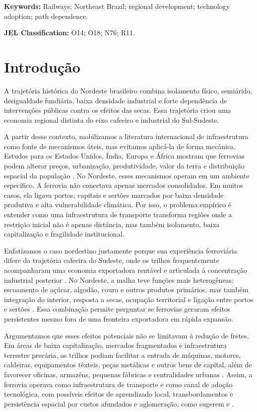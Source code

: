 \documentclass[12pt,a4paper]{article}
\newcommand{\keywords}{Railways; Northeast Brazil; regional development; technology adoption; path dependence}
\newcommand{\jel}{O14; O18; N76; R11}
\begin{document}
\vspace{0.3cm}
\noindent\textbf{Keywords:} \keywords.

\vspace{0.3cm}
\noindent\textbf{JEL Classification:} \jel.

\newpage

\section{Introdução}

A trajetória histórica do Nordeste brasileiro combina isolamento físico, semiárido, desigualdade fundiária, baixa densidade industrial e forte dependência de intervenções públicas contra os efeitos das secas. Essa trajetória criou uma economia regional distinta do eixo cafeeiro e industrial do Sul-Sudeste.

A partir desse contexto, mobilizamos a literatura internacional de infraestrutura como fonte de mecanismos úteis, mas evitamos aplicá-la de forma mecânica. Estudos para os Estados Unidos, Índia, Europa e África mostram que ferrovias podem alterar preços, urbanização, produtividade, valor da terra e distribuição espacial da população \citep{fogel1964,donaldsonhornbeck2016,donaldson2018,berger2017,jedwab2016}. No Nordeste, esses mecanismos operam em um ambiente específico. A ferrovia não conectava apenas mercados consolidados. Em muitos casos, ela ligava portos, capitais e sertões marcados por baixa densidade produtiva e alta vulnerabilidade climática. Por isso, o problema empírico é entender como uma infraestrutura de transporte transforma regiões onde a restrição inicial não é apenas distância, mas também isolamento, baixa capitalização e fragilidade institucional.

Enfatizamos o caso nordestino justamente porque sua experiência ferroviária difere da trajetória cafeeira do Sudeste, onde os trilhos frequentemente acompanharam uma economia exportadora rentável e articulada à concentração industrial posterior \citep{cano1977,summerhill2003}. No Nordeste, a malha teve funções mais heterogêneas: escoamento de açúcar, algodão, couro e outros produtos primários, mas também integração do interior, resposta a secas, ocupação territorial e ligação entre portos e sertões \citep{crockatt1893,summerhill2003}. Essa combinação permite perguntar se ferrovias geraram efeitos persistentes mesmo fora de uma fronteira exportadora em rápida expansão.

Argumentamos que esses efeitos potenciais não se limitavam à redução de fretes. Em áreas de baixa capitalização, mercados fragmentados e infraestrutura terrestre precária, os trilhos podiam facilitar a entrada de máquinas, motores, caldeiras, equipamentos têxteis, peças metálicas e outros bens de capital, além de favorecer oficinas, armazéns, pequenas fábricas e centralidades urbanas \citep{graham1968,eisenberg1974}. Assim, a ferrovia operava como infraestrutura de transporte e como canal de adoção tecnológica, com possíveis efeitos de aprendizado local, transbordamentos e persistência espacial por custos afundados e aglomeração, como sugerem \citet{berger2017} e \citet{jedwab2016}.
\end{document}
